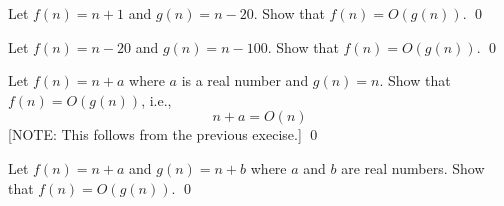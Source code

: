 \begin{ex}
Let
$f(n) = n + 1$
and 
$g(n) = n - 20$.
Show that $f(n) = O(g(n))$.
\qed
\end{ex}

\begin{ex}
Let
$f(n) = n - 20$
and 
$g(n) = n - 100$.
Show that $f(n) = O(g(n))$.
\qed
\end{ex}

\begin{ex}
Let $f(n) = n + a$ where $a$ is a real number and $g(n) = n$.
Show that $f(n) = O(g(n))$, i.e.,
\[
n + a = O(n)
\]
[NOTE: This follows from the previous execise.]
\qed
\end{ex}

\begin{ex}
Let
$f(n) = n + a$
and 
$g(n) = n + b$
where $a$ and $b$ are real numbers.
Show that $f(n) = O(g(n))$.
\qed
\end{ex}

